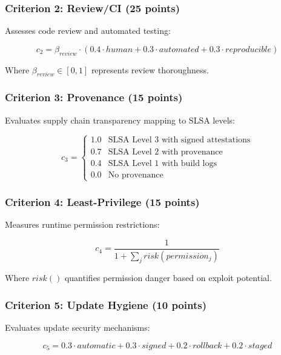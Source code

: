 \documentclass[11pt,a4paper]{article}
\begin{document}
\subsubsection{Criterion 2: Review/CI (25 points)}

Assesses code review and automated testing:

\begin{equation}
c_2 = \beta_{review} \cdot (0.4 \cdot human + 0.3 \cdot automated + 0.3 \cdot reproducible)
\end{equation}

Where $\beta_{review} \in [0,1]$ represents review thoroughness.

\subsubsection{Criterion 3: Provenance (15 points)}

Evaluates supply chain transparency mapping to SLSA levels:

\begin{equation}
c_3 = \begin{cases}
1.0 & \text{SLSA Level 3 with signed attestations} \\
0.7 & \text{SLSA Level 2 with provenance} \\
0.4 & \text{SLSA Level 1 with build logs} \\
0.0 & \text{No provenance}
\end{cases}
\end{equation}

\subsubsection{Criterion 4: Least-Privilege (15 points)}

Measures runtime permission restrictions:

\begin{equation}
c_4 = \frac{1}{1 + \sum_{j} risk(permission_j)}
\end{equation}

Where $risk()$ quantifies permission danger based on exploit potential.

\subsubsection{Criterion 5: Update Hygiene (10 points)}

Evaluates update security mechanisms:

\begin{equation}
c_5 = 0.3 \cdot automatic + 0.3 \cdot signed + 0.2 \cdot rollback + 0.2 \cdot staged
\end{equation}
\end{document}

